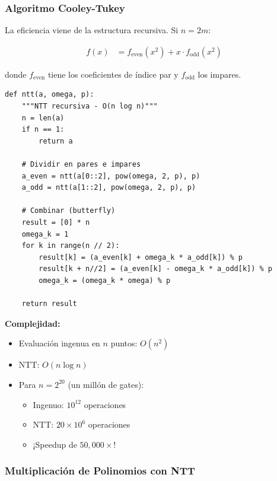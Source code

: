 \documentclass[11pt,a4paper,twoside,openright]{book}
\theoremstyle{definition}
\theoremstyle{plain}
\theoremstyle{remark}
\begin{document}
\subsubsection{Algoritmo Cooley-Tukey}

La eficiencia viene de la estructura recursiva. Si $n = 2m$:

\begin{align*}
    f(x) &= f_{\text{even}}(x^2) + x \cdot f_{\text{odd}}(x^2)
\end{align*}

donde $f_{\text{even}}$ tiene los coeficientes de índice par y $f_{\text{odd}}$ los impares.

\begin{verbatim}
def ntt(a, omega, p):
    """NTT recursiva - O(n log n)"""
    n = len(a)
    if n == 1:
        return a
    
    # Dividir en pares e impares
    a_even = ntt(a[0::2], pow(omega, 2, p), p)
    a_odd = ntt(a[1::2], pow(omega, 2, p), p)
    
    # Combinar (butterfly)
    result = [0] * n
    omega_k = 1
    for k in range(n // 2):
        result[k] = (a_even[k] + omega_k * a_odd[k]) % p
        result[k + n//2] = (a_even[k] - omega_k * a_odd[k]) % p
        omega_k = (omega_k * omega) % p
    
    return result
\end{verbatim}

\begin{mathnote}
\textbf{Complejidad:}
\begin{itemize}
    \item Evaluación ingenua en $n$ puntos: $O(n^2)$
    \item NTT: $O(n \log n)$
    \item Para $n = 2^{20}$ (un millón de gates): 
    \begin{itemize}
        \item Ingenuo: $10^{12}$ operaciones
        \item NTT: $20 \times 10^6$ operaciones
        \item ¡Speedup de $50,000\times$!
    \end{itemize}
\end{itemize}
\end{mathnote}

\subsubsection{Multiplicación de Polinomios con NTT}
\end{document}
